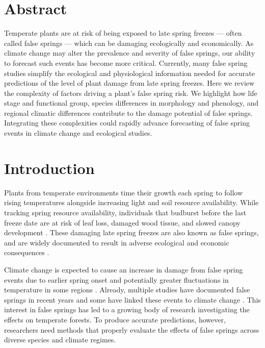 \documentclass{article}\usepackage[]{graphicx}\usepackage[]{color}
\begin{document}
\section*{Abstract}
Temperate plants are at risk of being exposed to late spring freezes --- often called false springs --- which can be damaging ecologically and economically. As climate change may alter the prevalence and severity of false springs, our ability to forecast such events has become more critical. Currently, many false spring studies simplify the ecological and physiological information needed for accurate predictions of the level of plant damage from late spring freezes. Here we review the complexity of factors driving a plant's false spring risk. We highlight how life stage and functional group, species differences in morphology and phenology, and regional climatic differences contribute to the damage potential of false springs. %
Integrating these complexities could rapidly advance forecasting of false spring events in climate change and ecological studies.

\section*{Introduction}

Plants from temperate environments time their growth each spring to follow rising temperatures alongside increasing light and soil resource availability. While tracking spring resource availability, individuals that budburst before the last freeze date are at risk of leaf loss, damaged wood tissue, and slowed canopy development \citep{Gu2008, Hufkens2012}. These damaging late spring freezes are also known as false springs, and are widely documented to result in adverse ecological and economic consequences \citep{Ault2013, Knudson2012}.

Climate change is expected to cause an increase in damage from false spring events due to earlier spring onset and potentially greater fluctuations in temperature in some regions \citep{Inouye2008, Martin2010}. Already, multiple studies have documented false springs in recent years \citep{Augspurger2009, Augspurger2013, Gu2008, Menzel2015} and some have linked these events to climate change \citep{Allstadt2015, Ault2013,  Muffler2016, Vitra2017, Xin2016}. This interest in false springs has led to a growing body of research investigating the effects on temperate forests. To produce accurate predictions, however, researchers need methods that properly evaluate the effects of false springs across diverse species and climate regimes. 
\end{document}
